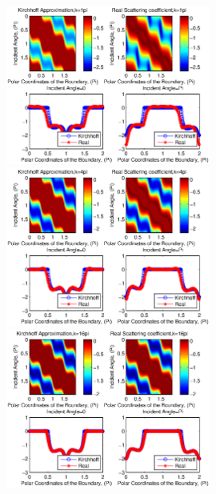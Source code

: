 \documentclass[12pt]{iopart}
\begin{document}
\begin{figure}
	\centering
	\includegraphics[width=0.6\textwidth]{./figure_sc/scattering_coefficient_rctangle_1.eps}
	\includegraphics[width=0.6\textwidth]{./figure_sc/scattering_coefficient_rctangle_4.eps}
	\includegraphics[width=0.6\textwidth]{./figure_sc/scattering_coefficient_rctangle_16.eps}
	\caption{}\label{rectangle}
\end{figure}
\end{document}
